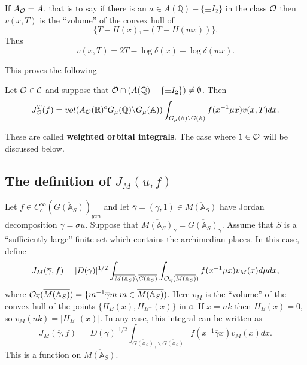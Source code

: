 If $A_{\cal{O}}=A$, that is to say if there is an
$a\in A({\mathbb{Q}})-\{\pm I_2\}$ in the class ${\cal{O}}$
then $v(x,T)$ is the ``volume'' of the convex hull of 
\[
\{T-H(x),-(T-H(wx))\}. 
\]
Thus 
\begin{equation}
v(x,T)=2T-\log \delta(x)-\log \delta(wx).
\end{equation}

This proves the following

\begin{theorem}
Let ${\cal{O}}\in \mathcal{C}$ and suppose that
${\cal{O}}\cap (A({\mathbb{Q}})-\{\pm I_2\})\not=\emptyset $.
Then 
\[
J_{\cal{O}}^T(f)
=vol(A_{\cal{O}}({\mathbb{R}})^oG_\mu ({\mathbb{Q}})\backslash G_\mu ({\mathbb{A}}))
\int_{G_\mu ({\mathbb{A}})\backslash G({\mathbb{A}})}f(x^{-1}\mu x)v(x,T)dx. 
\]
\end{theorem}

These are called \textbf{weighted orbital integrals}.
The case where $1\in {\cal{O}}$ will be discussed below.

\subsection{The definition of $J_M(u,f)$}

Let $f\in C_c^\infty (\overline{G({\mathbb {A}}_S)})_{gen}$ and let
$\overline{\gamma}=(\gamma,1) \in \overline{M({\mathbb {A}}_S)}$
have Jordan decomposition
$\gamma =\sigma u$. Suppose that
$\overline{M({\mathbb{A}}_S)}_{\overline{\gamma}}
=\overline{G({\mathbb{A}}_S)}_{\overline{\gamma}} $.
Assume that $S$ is a ``sufficiently large'' finite set which contains
the archimedian places. In this case, define 
\begin{equation}
J_M(\overline{\gamma} ,f)=|D(\gamma )|^{1/2}
\int_{\overline{M({\mathbb {A}}_S)}
\backslash \overline{G({\mathbb {A}}_S)}}
\int_{{\cal O}_{\overline{\gamma}} (\overline{M({\mathbb {A}}_S)})}
f(x^{-1}\mu x)v_M(x)d\mu dx,
\end{equation}
where ${\cal O}_{\overline{\gamma}} (\overline{M({\mathbb {A}}_S)})
=\{m^{-1}\overline{\gamma} m\;m\in \overline{M({\mathbb {A}}_S)})$.
Here $v_M$ is the ``volume'' of the convex hull of the points
$\{H_B(x),H_{B^{-}}(x)\}$ in ${\mathfrak a}$. If $x=nk$ then
$H_B(x)=0$, so $v_M(nk)=|H_{B^{-}}(x)|$.
In any case, this integral can be written as 
\[
J_M(\overline{\gamma} ,f)=|D(\gamma )|^{1/2}
\int_{\overline{G({\mathbb {A}}_S)}_{\overline{\gamma}}
\backslash \overline{G({\mathbb{A}}_S)}}
f(x^{-1}\overline{\gamma} x)v_M(x)dx. 
\]
This is a function on $\overline{M({\mathbb {A}}_S)}$.

